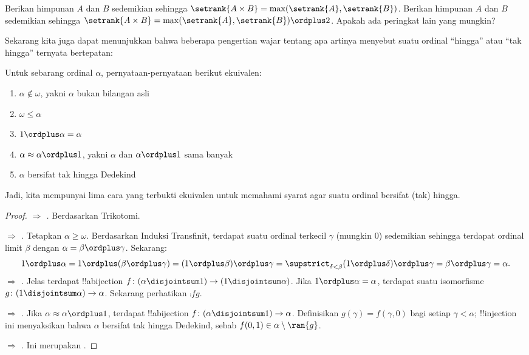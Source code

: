 \documentclass[../../../include/open-logic-section]{subfiles}
\begin{document}
\begin{prob}
Berikan himpunan $A$ dan $B$ sedemikian sehingga $\setrank{A \times B}=
\max(\setrank{A}, \setrank{B})$. Berikan himpunan $A$ dan $B$ sedemikian
sehingga $\setrank{A \times B}=\max(\setrank{A}, \setrank{B}) \ordplus
2$. Apakah ada peringkat lain yang mungkin?
\end{prob}

Sekarang kita juga dapat menunjukkan bahwa beberapa pengertian wajar tentang
apa artinya menyebut suatu ordinal ``hingga'' atau ``tak hingga'' ternyata
bertepatan:

\begin{lem}
Untuk sebarang ordinal $\alpha$, pernyataan-pernyataan berikut ekuivalen:
\begin{enumerate}
	\item{} $\alpha\notin \omega$, yakni $\alpha$
	bukan bilangan asli
	\item{} $\omega \leq \alpha$
	\item{} $1 \ordplus  \alpha = \alpha$
	\item{} $\alpha \approx \alpha\ordplus 1$,
	yakni $\alpha$ dan $\alpha\ordplus 1$ sama banyak
	\item{} $\alpha$ bersifat tak hingga Dedekind
	\end{enumerate}
\end{lem}
\noindent
Jadi, kita mempunyai lima cara yang terbukti ekuivalen untuk memahami syarat
agar suatu ordinal bersifat (tak) hingga.

\begin{proof}
\emph{ $\Rightarrow$ .}
Berdasarkan Trikotomi.

\emph{ $\Rightarrow$ .} Tetapkan
$\alpha \geq \omega$. Berdasarkan Induksi Transfinit, terdapat suatu ordinal
terkecil $\gamma$ (mungkin $0$) sedemikian sehingga terdapat ordinal limit
$\beta$ dengan $\alpha = \beta \ordplus \gamma$. Sekarang:
\[
	1 \ordplus \alpha =
	1 \ordplus (\beta \ordplus \gamma) =
	(1 \ordplus \beta) \ordplus \gamma =
	\supstrict_{\delta < \beta} (1 \ordplus  \delta) \ordplus  \gamma =
	\beta \ordplus  \gamma =
	\alpha.
\]
\emph{ $\Rightarrow$ .} Jelas
terdapat !!a{bijection} $f \colon (\alpha \disjointsum 1) \to (1
\disjointsum \alpha)$. Jika $1 \ordplus \alpha = \alpha$, terdapat suatu
isomorfisme $g \colon (1 \disjointsum \alpha) \to \alpha$. Sekarang
perhatikan $\comp{f}{g}$.

\emph{ $\Rightarrow$ .} Jika
$\alpha \approx \alpha \ordplus 1$, terdapat !!a{bijection} $f \colon
(\alpha \disjointsum 1) \to \alpha$. Definisikan $g(\gamma) = f(\gamma,
0)$ bagi setiap $\gamma < \alpha$; !!{injection} ini menyaksikan bahwa
$\alpha$ bersifat tak hingga Dedekind, sebab $f(0,1) \in \alpha \setminus
\ran{g}$.

\emph{ $\Rightarrow$ .} Ini
merupakan .
\end{proof}
\end{document}
